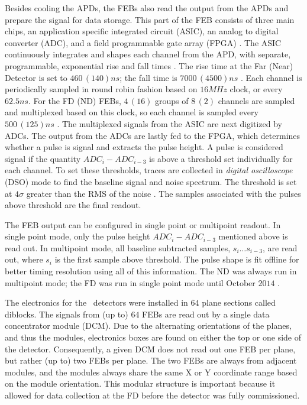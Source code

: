 Besides cooling the APDs, the FEBs also read the output from the APDs and prepare the signal for data storage. This part of the FEB consists of three main chips, an application specific integrated circuit (ASIC), an analog to digital converter (ADC), and a field programmable gate array (FPGA) \cite{ref:FEBSummary1, ref:FEBSummary2}. The ASIC continuously integrates and shapes each channel from the APD, with separate, programmable, exponential rise and fall times \cite{ref:FEBASIC}. The rise time at the Far (Near) Detector is set to $460\,(140)\unit{ns}$; the fall time is $7000\,(4500)\unit{ns}$ \cite{ref:ThesisEvan}. Each channel is periodically sampled in round robin fashion based on $16\unit{MHz}$ clock, or every $62.5\unit{ns}$. For the FD (ND) FEBs, $4\,(16)$ groups of $8\,(2)$ channels are sampled and multiplexed based on this clock, so each channel is sampled every $500\,(125)\unit{ns}$ \cite{ref:FEBASIC}. The multiplexed signals from the ASIC are next digitized by ADCs. The output from the ADCs are lastly fed to the FPGA, which determines whether a pulse is signal and extracts the pulse height. A pulse is considered signal if the quantity $ADC_i - ADC_{i - 3}$ \cite{ref:FEBManual} is above a threshold set individually for each channel. To set these thresholds, traces are collected in {\em digital oscilloscope} (DSO) mode to find the baseline signal and noise spectrum. The threshold is set at $4\sigma$ greater than the RMS of the noise \cite{ref:DSOThreshold}. The samples associated with the pulses above threshold are the final readout. 

The FEB output can be configured in single point or multipoint readout. In single point mode, only the pulse height $ADC_i - ADC_{i - 3}$ mentioned above is read out. In multipoint mode, all baseline subtracted samples, $s_i \dots s_{i - 3}$, are read out, where $s_{i}$ is the first sample above threshold. The pulse shape is fit offline for better timing resolution using all of this information. The ND was always run in multipoint mode; the FD was run in single point mode until October $2014$ \cite{ref:ThesisEvan}.

The electronics for the \nova~detectors were installed in $64$ plane sections called diblocks. The signals from (up to) $64$ FEBs are read out by a single data concentrator module (DCM). Due to the alternating orientations of the planes, and thus the modules, electronics boxes are found on either the top or one side of the detector. Consequently, a given DCM does not read out one FEB per plane, but rather (up to) two FEBs per plane. The two FEBs are always from adjacent modules, and the modules always share the same X or Y coordinate range based on the module orientation. This modular structure is important because it allowed for data collection at the FD before the detector was fully commissioned.

